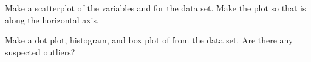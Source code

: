 \begin{exercise}
Make a scatterplot of the variables  and  for the  data set. Make the plot so that  is along the horizontal axis.
\end{exercise}

\begin{exercise}
Make a dot plot, histogram, and box plot of  from the  data set. Are there any suspected outliers?
\end{exercise}
